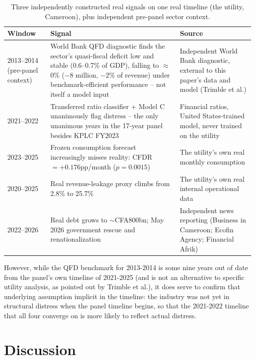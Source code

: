 \documentclass[final,1p,times]{elsarticle}
\begin{document}
\begin{table}[t]
\centering
\small
\caption{Three independently constructed real signals on one real timeline (the utility, Cameroon), plus independent pre-panel sector context.}
\label{tab:timeline}
\begin{tabular}{p{2.2cm} p{6.5cm} p{5.8cm}}
\toprule
\textbf{Window} & \textbf{Signal} & \textbf{Source} \\
\midrule
2013--2014 (pre-panel context) & World Bank QFD diagnostic finds the sector's quasi-fiscal deficit low and stable (0.6--0.7\% of GDP), falling to $\approx$0\% ($-8$ million, $-2\%$ of revenue) under benchmark-efficient performance -- not itself a model input & Independent World Bank diagnostic, external to this paper's data and model (Trimble et al.) \\
2021--2022 & Transferred ratio classifier + Model C unanimously flag distress -- the only unanimous years in the 17-year panel besides KPLC FY2023 & Financial ratios, United States-trained model, never trained on the utility \\
2023--2025 & Frozen consumption forecast increasingly misses reality: CFDR $= +0.176$pp/month ($p = 0.0015$) & The utility's own real monthly consumption \\
2020--2025 & Real revenue-leakage proxy climbs from 2.8\% to 25.7\% & The utility's own real internal operational data \\
2022--2026 & Real debt grows to $\sim$CFA800bn; May 2026 government rescue and renationalization & Independent news reporting (Business in Cameroon; Ecofin Agency; Financial Afrik) \\
\bottomrule
\end{tabular}
\end{table}

However, while the QFD benchmark for 2013-2014 is some nine years out of date from the panel’s own timeline of 2021-2025 (and is not an alternative to specific utility analysis, as pointed out by Trimble et al.), it does serve to confirm that underlying assumption implicit in the timeline: the industry was not yet in structural distress when the panel timeline begins, so that the 2021-2022 timeline that all four converge on is more likely to reflect actual distress.


\section{Discussion}
\label{S:discussion}
\end{document}
